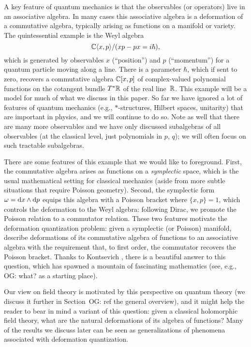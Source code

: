 \documentclass[11pt]{amsart}
\def\owen#1{{\textcolor{violet!65!black}{OG: {#1}}}}
\begin{document}
A key feature of quantum mechanics is that the observables (or operators) live in an associative algebra.
In many cases this associative algebra is a deformation of a commutative algebra, typically arising as functions on a manifold or variety.
The quintessential example is the Weyl algebra
\[
\mathbb C \langle x, p \rangle /(xp - px = i \hbar),
\] 
which is generated by observables $x$ (``position'') and $p$ (``momentum'') for a quantum particle moving along a line.
There is a parameter $\hbar$, which if sent to zero, recovers a commutative algebra $\mathbb C [ x, p ]$ of complex-valued polynomial functions on the cotangent bundle $T^* \mathbb R$ of the real line~$\mathbb R$.
This example will be a model for much of what we discuss in this paper.
So far we have ignored a lot of features of quantum mechanics (e.g., $\ast$-structures, Hilbert spaces, unitarity) that are important in physics,
and we will continue to do so.
Note as well that there are many more observables and we have only discussed subalgebras of all observables (at the classical level, just polynomials in $p$, $q$);
we will often focus on such tractable subalgebras. 

There are some features of this example that we would like to foreground. 
First, the commutative algebra arises as functions on a {\em symplectic} space,
which is the usual mathematical setting for classical mechanics (aside from more subtle situations that require Poisson geometry).
Second, the symplectic form $\omega = {\rm d} x \wedge {\rm d} p$ equips this algebra 
with a Poisson bracket where $\{ x, p \} = 1$,
which controls the deformation to the Weyl algebra: following Dirac, we promote the Poisson relation to a commutator relation.
These two features motivate the deformation quantization problem: 
given a symplectic (or Poisson) manifold,
describe deformations of its commutative algebra of functions to an associative algebra with the requirement that, to first order,  the commutator recovers the Poisson bracket.
Thanks to Kontsevich \cite{KonDQ}, there is a beautiful answer to this question, which has spawned a mountain of fascinating mathematics (see, e.g., \owen{what?} as a starting place).

Our view on field theory is motivated by this perspective on quantum theory (we discuss it further in Section~\owen{ref the general overview}), 
and it might help the reader to bear in mind a variant of this question:
given a classical holomorphic field theory, what are the natural deformations of its algebra of functions?
Many of the results we discuss later can be seen as generalizations of phenomena associated with deformation quantization.
\end{document}
